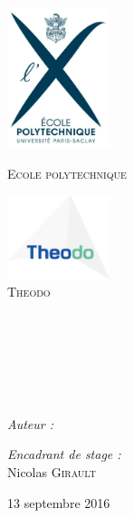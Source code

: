 
\begin{titlepage}

\begin{center}

\begin{minipage}[t]{0.48\textwidth}
  \begin{flushleft}
    \includegraphics [width=30mm]{images/logo-X.jpg} \\[0.5cm]
    \begin{spacing}{1.5}
      \textsc{\LARGE Ecole polytechnique}
    \end{spacing}
  \end{flushleft}
\end{minipage}
\begin{minipage}[t]{0.48\textwidth}
  \begin{flushright}
    \includegraphics [width=30mm]{images/logo-Theodo.png} \\[0.5cm]
    \textsc{\LARGE Theodo}
  \end{flushright}
\end{minipage} \\[1.5cm]

\textsc{\Large \reportsubject}\\[0.5cm]
\HRule \\[0.4cm]
{\huge \bfseries \reporttitle}\\[0.4cm]
\HRule \\[1.5cm]

\begin{minipage}[t]{0.3\textwidth}
  \begin{flushleft} \large
    \emph{Auteur :}\\
    \reportauthor
  \end{flushleft}
\end{minipage}
\begin{minipage}[t]{0.6\textwidth}
  \begin{flushright} \large
    \emph{Encadrant de stage :} \\
    Nicolas \textsc{Girault}
  \end{flushright}
\end{minipage}

\vfill

{\large 13 septembre 2016}

\end{center}

\end{titlepage}
